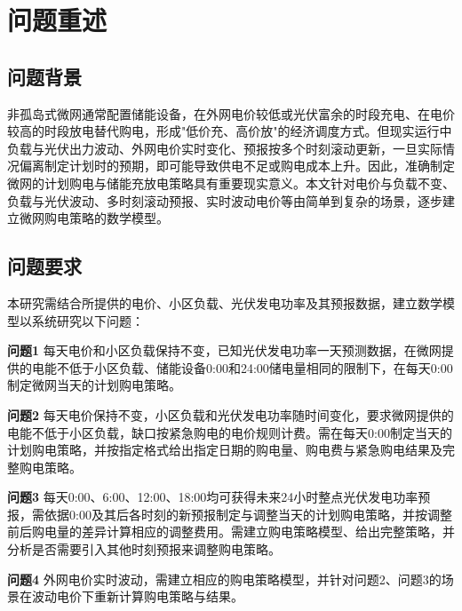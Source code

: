 \section{问题重述}

\subsection{问题背景}
非孤岛式微网通常配置储能设备，在外网电价较低或光伏富余的时段充电、在电价较高的时段放电替代购电，形成"低价充、高价放"的经济调度方式。但现实运行中负载与光伏出力波动、外网电价实时变化、预报按多个时刻滚动更新，一旦实际情况偏离制定计划时的预期，即可能导致供电不足或购电成本上升。因此，准确制定微网的计划购电与储能充放电策略具有重要现实意义。本文针对电价与负载不变、负载与光伏波动、多时刻滚动预报、实时波动电价等由简单到复杂的场景，逐步建立微网购电策略的数学模型。

\subsection{问题要求}
本研究需结合所提供的电价、小区负载、光伏发电功率及其预报数据，建立数学模型以系统研究以下问题：

\textbf{问题1} 每天电价和小区负载保持不变，已知光伏发电功率一天预测数据，在微网提供的电能不低于小区负载、储能设备0:00和24:00储电量相同的限制下，在每天0:00制定微网当天的计划购电策略。

\textbf{问题2} 每天电价保持不变，小区负载和光伏发电功率随时间变化，要求微网提供的电能不低于小区负载，缺口按紧急购电的电价规则计费。需在每天0:00制定当天的计划购电策略，并按指定格式给出指定日期的购电量、购电费与紧急购电结果及完整购电策略。

\textbf{问题3} 每天0:00、6:00、12:00、18:00均可获得未来24小时整点光伏发电功率预报，需依据0:00及其后各时刻的新预报制定与调整当天的计划购电策略，并按调整前后购电量的差异计算相应的调整费用。需建立购电策略模型、给出完整策略，并分析是否需要引入其他时刻预报来调整购电策略。

\textbf{问题4} 外网电价实时波动，需建立相应的购电策略模型，并针对问题2、问题3的场景在波动电价下重新计算购电策略与结果。
